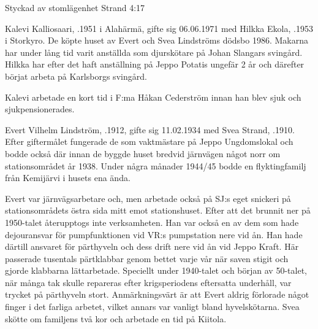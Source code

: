%

Styckad av stomlägenhet Strand 4:17


%
Kalevi Kalliosaari, .1951 i Alahärmä, gifte sig 06.06.1971 med Hilkka Ekola, .1953 i Storkyro. De köpte huset av Evert och Svea Lindströms dödsbo 1986. Makarna har under lång tid varit anställda som djurskötare på Johan Slangars svingård. Hilkka har efter det haft anställning på Jeppo Potatis ungefär 2 år och därefter börjat arbeta på Karlsborgs svingård.

Kalevi arbetade en kort tid i F:ma Håkan Cederström innan han blev sjuk och sjukpensionerades.
\begin{jhchildren}
  \item {}
  \item {}
  \item {}
\end{jhchildren}


%
Evert Vilhelm Lindström, .1912, gifte sig 11.02.1934 med Svea Strand, .1910. Efter giftermålet fungerade de som vaktmästare på Jeppo Ungdomslokal och bodde också där innan de byggde huset bredvid järnvägen något norr om stationsområdet år 1938. Under några månader 1944/45 bodde en flyktingfamilj från Kemijärvi i husets ena ända.

Evert var järnvägsarbetare och, men arbetade också på SJ:s eget snickeri på stationsområdets östra sida mitt emot stationshuset. Efter att det brunnit ner på 1950-talet återupptogs inte verksamheten. Han var också en av dem som hade dejouransvar för pumpfunktionen vid VR:s pumpstation nere vid ån. Han hade därtill ansvaret för pärthyveln och dess drift nere vid ån vid Jeppo Kraft. Här passerade tusentals pärtklabbar genom bettet varje vår när saven stigit och gjorde klabbarna lättarbetade. Speciellt under 1940-talet och början av 50-talet, när många tak skulle repareras efter krigsperiodens eftersatta underhåll, var trycket på pärthyveln stort. Anmärkningsvärt är att Evert aldrig förlorade något finger i det farliga arbetet, vilket annars var vanligt bland hyvelskötarna. Svea skötte om familjens två kor och  arbetade en tid på Kiitola.
\begin{jhchildren}
  \item {}
  \item {}
\end{jhchildren}


